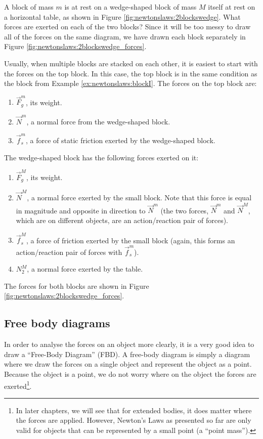 \begin{example}{A block of mass $m$ is at rest on a wedge-shaped block of mass $M$ itself at rest on a horizontal table, as shown in Figure \ref{fig:newtonslaws:2blockswedge}. What forces are exerted on each of the two blocks? }
\label{ex:newtonslaws:2blockswedge}
Since it will be too messy to draw all of the forces on the same diagram, we have drawn each block separately in Figure \ref{fig:newtonslaws:2blockswedge_forces}. 

Usually, when multiple blocks are stacked on each other, it is easiest to start with the forces on the top block. In this case, the top block is in the same condition as the block from Example \ref{ex:newtonslaws:blockI}. The forces on the top block are:
\begin{enumerate}
\item $\vec F_g^m$, its weight.
\item $\vec N^m$, a normal force from the wedge-shaped block.
\item $\vec f_s^m$, a force of static friction exerted by the wedge-shaped block.
\end{enumerate}

The wedge-shaped block has the following forces exerted on it:
\begin{enumerate}
\item $\vec F_g^M$, its weight.
\item $\vec N^M$, a normal force exerted by the small block. Note that this force is equal in magnitude and opposite in direction to $\vec N^m$ (the two forces, $\vec N^m$ and $\vec N^M$, which are on different objects, are an action/reaction pair of forces).
\item $\vec f_s^M$, a force of friction exerted by the small block (again, this forms an action/reaction pair of forces with  $\vec f_s^m$). 
\item $N_2^M$, a normal force exerted by the table.
\end{enumerate}


The forces for both blocks are shown in Figure \ref{fig:newtonslaws:2blockswedge_forces}.
\end{example}


\subsection{Free body diagrams}
In order to analyse the forces on an object more clearly, it is a very good idea to draw a ``Free-Body Diagram'' (FBD). A free-body diagram is simply a diagram where we draw the forces on a single object and represent the object as a point. Because the object is a point, we do not worry where on the object the forces are exerted\footnote{In later chapters, we will see that for extended bodies, it does matter where the forces are applied. However, Newton's Laws as presented so far are only valid for objects that can be represented by a small point (a ``point mass'').}.

